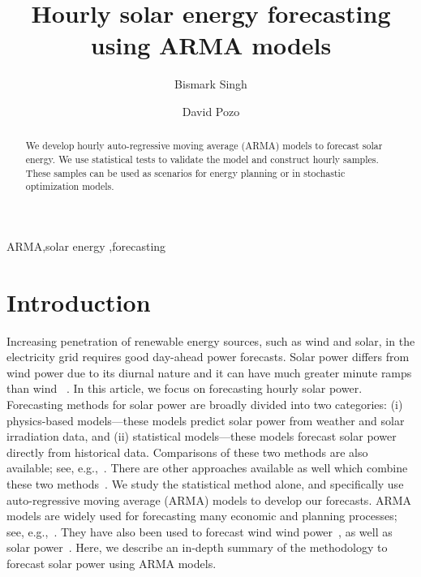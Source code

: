\documentclass[review]{elsarticle}
\begin{document}
\begin{frontmatter}

\title{Hourly solar energy forecasting using ARMA models }

\author{Bismark Singh}
\address{Discrete Mathematics \& Optimization, Sandia National Laboratories 
}


\author{David Pozo}
\address{Center for Energy Systems , Skolkovo Institute of Science and 
Technology}

\begin{abstract}
We develop hourly auto-regressive moving average (ARMA) models to forecast 
solar energy. We use statistical tests to validate the model and construct 
hourly samples. These samples can be used as scenarios for energy planning or 
in stochastic optimization models.
\end{abstract}

\begin{keyword}
ARMA\sep solar energy \sep forecasting 
\end{keyword}

\end{frontmatter}

\linenumbers

\section{Introduction}
Increasing penetration of renewable energy sources, such as wind and solar, in 
the electricity grid requires good day-ahead power forecasts. Solar power 
differs from wind power due to its diurnal nature and it can have much greater 
minute ramps than wind~\cite{graabak2016variability} . In this article, we focus 
on forecasting 
hourly solar power. Forecasting methods for solar power are broadly divided 
into 
two categories: (i) physics-based models---these models predict solar power 
from weather and solar irradiation data, and (ii) statistical models---these 
models forecast 
solar power directly from historical data. Comparisons of these two 
methods are also available; see, 
e.g.,~\cite{huang2010comparative,inman2013solar}. There are other 
approaches available as well which combine these two 
methods~\cite{chen2011online}. We study the statistical 
method alone, and specifically use auto-regressive moving average (ARMA) 
models to develop our forecasts. ARMA models are widely used for forecasting 
many economic and planning processes; see, e.g.,~\cite{box2008time}. They 
 have also been used to forecast wind wind power~\cite{brown1984time, 
duran2007short}, as well as solar 
power~\cite{mora1998multiplicative,huang2012solar}. Here, we describe an 
in-depth summary of the methodology to forecast solar power using ARMA models.
\end{document}
